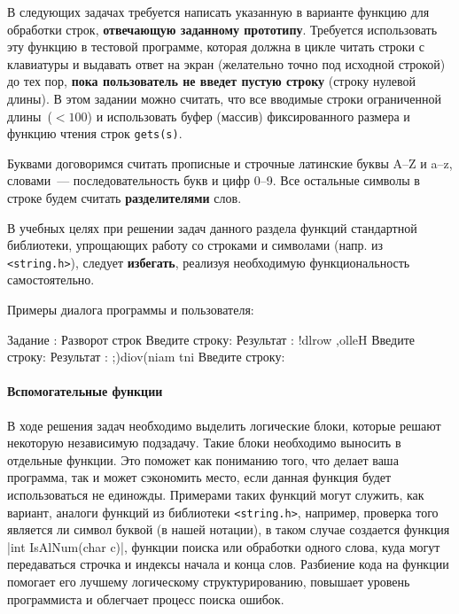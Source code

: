 
В следующих задачах требуется написать указанную в варианте функцию для
обработки строк, \textbf{отвечающую заданному прототипу}. Требуется использовать
эту функцию в тестовой программе, которая должна в цикле читать строки с
клавиатуры и выдавать ответ на экран (желательно точно под исходной строкой)
до тех пор, \textbf{пока пользователь не введет пустую строку} (строку нулевой длины).
В этом задании можно считать, что все вводимые строки ограниченной
длины~($<100$) и использовать буфер (массив) фиксированного размера и
функцию чтения строк \texttt{gets(s)}.

Буквами договоримся считать прописные и строчные латинские буквы 
A--Z и a--z, словами~--- последовательность букв и цифр 0--9. Все остальные
символы в строке будем считать \textbf{разделителями} слов.

В учебных целях при решении задач данного раздела функций стандартной
библиотеки, упрощающих работу со строками и символами (напр. из 
\texttt{<string.h>}), следует \textbf{избегать}, реализуя необходимую
функциональность самостоятельно.

Примеры диалога программы и пользователя:

\begin{zzoutput}
  Задание : Разворот строк
  Введите строку: 
  Результат     : !dlrow ,olleH
  Введите строку: 
  Результат     : ;)diov(niam tni
  Введите строку: \zzuser{ }
\end{zzoutput}


\zzsectionCOMMENTS

\paragraph{Вспомогательные функции}
В ходе решения задач необходимо выделить логические блоки, которые решают некоторую независимую подзадачу. Такие блоки необходимо выносить в отдельные функции. Это поможет как пониманию того, что делает ваша программа, так и может сэкономить место, если данная функция будет использоваться не единожды. Примерами таких функций могут служить, как вариант, аналоги функций из библиотеки \texttt{<string.h>}, например, проверка того является ли символ буквой (в нашей нотации), в таком случае создается функция \zzmintinline|int IsAlNum(char c)|, функции поиска или обработки одного слова, куда могут передаваться строчка и индексы начала и конца слов.
Разбиение кода на функции помогает его лучшему логическому структурированию, повышает уровень программиста и облегчает процесс поиска ошибок.

